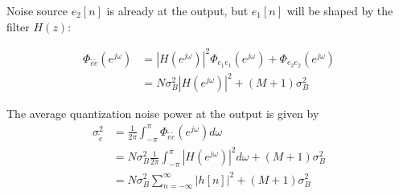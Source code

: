 \documentclass[10pt]{beamer}
\begin{document}
\begin{frame}

Noise source $e_2[n]$ is already at the output, but $e_1[n]$ will be shaped by the filter $H(z)$:

\begin{align*}
\Phi_{\tilde{e}\tilde{e}}(e^{j\omega}) &= |H(e^{j\omega})|^2\Phi_{e_1e_1}(e^{j\omega}) +  \Phi_{e_2e_2}(e^{j\omega})\\
& = N\sigma_{B}^2|H(e^{j\omega})|^2 + (M+1)\sigma_{B}^2
\end{align*}

The average quantization noise power at the output is given by
\begin{align*}
\sigma_{\tilde{e}}^2 & =\frac{1}{2\pi}\int_{-\pi}^{\pi}\Phi_{\tilde{e}\tilde{e}}(e^{j\omega})d\omega \\
&= N\sigma_{B}^2\frac{1}{2\pi}\int_{-\pi}^{\pi} |H(e^{j\omega})|^2d\omega + (M+1)\sigma_{B}^2 \\
&= N\sigma_{B}^2\sum_{n=-\infty}^{\infty}|h[n]|^2 + (M+1)\sigma_{B}^2
\end{align*}

\end{frame}
\end{document}
